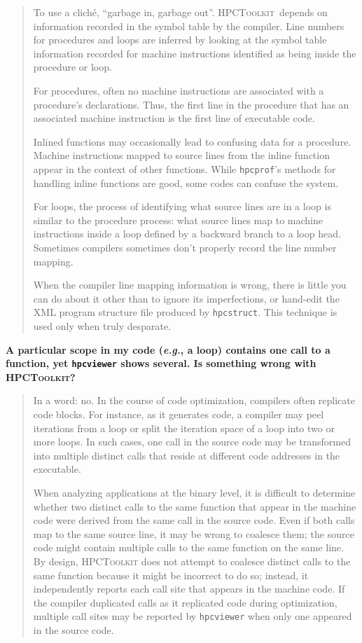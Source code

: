 \documentclass{article}
\newcommand{\hpctoolkit}{\textsc{HPCToolkit}}
\newcommand{\hpcstruct}{\texttt{hpcstruct}}
\newcommand{\hpcprof}{\texttt{hpcprof}}
\newcommand{\hpcviewer}{\texttt{hpcviewer}}
\newcommand{\eg}{{\em e.g.}}
\begin{document}
\begin{quote}
To use a clich\'{e}, ``garbage in, garbage out''. \hpctoolkit\ 
depends on information recorded in the symbol table by the
compiler. Line numbers for procedures and loops are inferred by
looking at the symbol table information recorded for machine
instructions identified as being inside the procedure or loop.


For procedures, often no machine instructions are associated with a
procedure's declarations. Thus, the first line in the procedure that
has an associated machine instruction is the first line of executable
code.

Inlined functions may occasionally lead to confusing data for a
procedure. Machine instructions mapped to source lines from the inline
function appear in the context of other functions. While \hpcprof 's
methods for handling inline functions are good, some codes can confuse
the system.

For loops, the process of identifying what source lines are in a loop
is similar to the procedure process: what source lines map to machine
instructions inside a loop defined by a backward branch to a loop
head. Sometimes compilers sometimes don’t properly record the line
number mapping.

When the compiler line mapping information is wrong, there is little
you can do about it other than to ignore its imperfections, or
hand-edit the XML program structure file produced by \hpcstruct . This
technique is used only when truly desparate.
\end{quote}

\textbf{A particular scope in my code (\eg, a loop) contains one call to a 
function, yet \hpcviewer{} shows several. Is something wrong with \hpctoolkit{}?}
\begin{quote}
In a word: no. In the course of code optimization, compilers often replicate code blocks. 
For instance, as it generates code, a compiler may peel iterations from a loop or split the iteration 
space of a loop into two or more loops. 
In such cases, one call in the source code may be transformed into multiple 
distinct calls that reside at different code addresses in the executable. 

When analyzing applications at the binary level, it is difficult to 
determine whether two distinct calls to the same function that appear in the machine 
code were derived from the same call in the source code. 
Even if both calls map to the same source line, it may be wrong to coalesce them; 
the source code might contain multiple calls to the same function on the same line. 
By design, \hpctoolkit{} does not attempt to coalesce distinct calls to the same function
because it might be incorrect to do so; instead, it independently reports each call site 
that appears in the machine code. 
If the compiler duplicated calls as it replicated code during optimization,  
multiple call sites may be reported by \hpcviewer{} when only one appeared in the source code. 
\end{quote}
\end{document}
